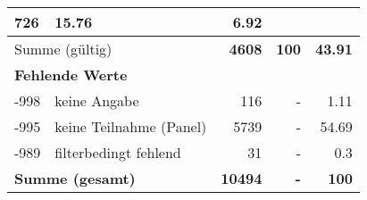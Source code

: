 \begin{longtable}{lXrrr}
       \num{726} &
       \num[round-mode=places,round-precision=2]{15,76} &
         \num[round-mode=places,round-precision=2]{6,92} \\
     \midrule
     \multicolumn{2}{l}{Summe (gültig)} &
       \textbf{\num{4608}} &
     \textbf{100} &
       \textbf{\num[round-mode=places,round-precision=2]{43,91}} \\
     \multicolumn{5}{l}{\textbf{Fehlende Werte}}\\
       -998 &
       keine Angabe &
         \num{116} &
        - &
         \num[round-mode=places,round-precision=2]{1,11} \\
       -995 &
       keine Teilnahme (Panel) &
         \num{5739} &
        - &
         \num[round-mode=places,round-precision=2]{54,69} \\
       -989 &
       filterbedingt fehlend &
         \num{31} &
        - &
         \num[round-mode=places,round-precision=2]{0,3} \\
     \midrule
     \multicolumn{2}{l}{\textbf{Summe (gesamt)}} &
          \textbf{\num{10494}} &
        \textbf{-} &
        \textbf{100} \\
     \bottomrule
     \end{longtable}
     
